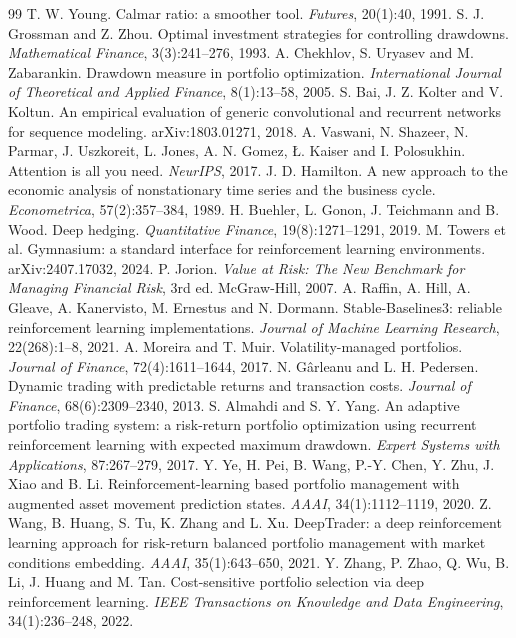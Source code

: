 \documentclass[11pt]{article}
\begin{document}
\begin{thebibliography}{99}
 T. W. Young. Calmar ratio: a smoother tool. \emph{Futures}, 20(1):40, 1991.
 S. J. Grossman and Z. Zhou. Optimal investment strategies for controlling drawdowns. \emph{Mathematical Finance}, 3(3):241--276, 1993.
 A. Chekhlov, S. Uryasev and M. Zabarankin. Drawdown measure in portfolio optimization. \emph{International Journal of Theoretical and Applied Finance}, 8(1):13--58, 2005.
 S. Bai, J. Z. Kolter and V. Koltun. An empirical evaluation of generic convolutional and recurrent networks for sequence modeling. arXiv:1803.01271, 2018.
 A. Vaswani, N. Shazeer, N. Parmar, J. Uszkoreit, L. Jones, A. N. Gomez, Ł. Kaiser and I. Polosukhin. Attention is all you need. \emph{NeurIPS}, 2017.
 J. D. Hamilton. A new approach to the economic analysis of nonstationary time series and the business cycle. \emph{Econometrica}, 57(2):357--384, 1989.
 H. Buehler, L. Gonon, J. Teichmann and B. Wood. Deep hedging. \emph{Quantitative Finance}, 19(8):1271--1291, 2019.
 M. Towers et al. Gymnasium: a standard interface for reinforcement learning environments. arXiv:2407.17032, 2024.
 P. Jorion. \emph{Value at Risk: The New Benchmark for Managing Financial Risk}, 3rd ed. McGraw-Hill, 2007.
 A. Raffin, A. Hill, A. Gleave, A. Kanervisto, M. Ernestus and N. Dormann. Stable-Baselines3: reliable reinforcement learning implementations. \emph{Journal of Machine Learning Research}, 22(268):1--8, 2021.
 A. Moreira and T. Muir. Volatility-managed portfolios. \emph{Journal of Finance}, 72(4):1611--1644, 2017.
 N. Gârleanu and L. H. Pedersen. Dynamic trading with predictable returns and transaction costs. \emph{Journal of Finance}, 68(6):2309--2340, 2013.
 S. Almahdi and S. Y. Yang. An adaptive portfolio trading system: a risk-return portfolio optimization using recurrent reinforcement learning with expected maximum drawdown. \emph{Expert Systems with Applications}, 87:267--279, 2017.
 Y. Ye, H. Pei, B. Wang, P.-Y. Chen, Y. Zhu, J. Xiao and B. Li. Reinforcement-learning based portfolio management with augmented asset movement prediction states. \emph{AAAI}, 34(1):1112--1119, 2020.
 Z. Wang, B. Huang, S. Tu, K. Zhang and L. Xu. DeepTrader: a deep reinforcement learning approach for risk-return balanced portfolio management with market conditions embedding. \emph{AAAI}, 35(1):643--650, 2021.
 Y. Zhang, P. Zhao, Q. Wu, B. Li, J. Huang and M. Tan. Cost-sensitive portfolio selection via deep reinforcement learning. \emph{IEEE Transactions on Knowledge and Data Engineering}, 34(1):236--248, 2022.

\end{thebibliography}
\end{document}
